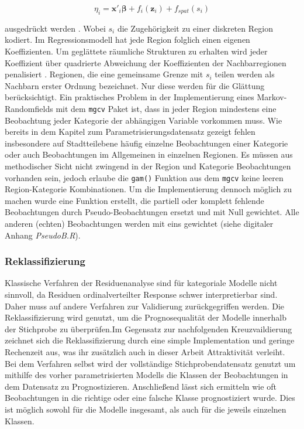 \documentclass{Vorlage}
\begin{document}
\begin{equation}
\eta_{i} =\mathbf{x}'_i \boldsymbol{\beta}+f_{i}(\mathbf{z}_{i})+f_{spat}(s_i)
\end{equation}

ausgedrückt werden \cite[p. 541]{fahrmeir2013regression}. Wobei $s_i$ die Zugehörigkeit zu einer diskreten Region kodiert. Im Regressionsmodell hat jede Region folglich einen eigenen Koeffizienten. Um geglättete räumliche Strukturen zu erhalten wird jeder Koeffizient über quadrierte Abweichung der Koeffizienten der Nachbarregionen penalisiert \cite[p. 522]{fahrmeir2013regression}. Regionen, die eine gemeinsame Grenze mit $s_i$ teilen werden als Nachbarn erster Ordnung bezeichnet. Nur diese werden für die Glättung berücksichtigt.
Ein praktisches Problem in der Implementierung eines Markov-Randomfields mit dem \texttt{mgcv} Paket ist, dass in jeder Region mindestens eine Beobachtung jeder Kategorie der abhängigen Variable vorkommen muss. Wie bereits in dem Kapitel zum Parametrisierungsdatensatz gezeigt fehlen insbesondere auf Stadtteilebene häufig einzelne Beobachtungen einer Kategorie oder auch Beobachtungen im Allgemeinen in einzelnen Regionen. Es müssen aus methodischer Sicht nicht zwingend in der Region und Kategorie Beobachtungen vorhanden sein, jedoch erlaube die \texttt{gam()} Funktion aus dem \texttt{mgcv} keine leeren Region-Kategorie Kombinationen. Um die Implementierung dennoch möglich zu machen wurde eine Funktion erstellt, die partiell oder komplett fehlende Beobachtungen durch Pseudo-Beobachtungen ersetzt und mit Null gewichtet. Alle anderen (echten) Beobachtungen werden mit eins gewichtet (siehe digitaler Anhang \textit{PseudoB.R}).

\subsubsection{Reklassifizierung}
Klassische Verfahren der Residuenanalyse sind für kategoriale Modelle nicht sinnvoll, da Residuen ordinalverteilter Response schwer interpretierbar sind. Daher muss auf andere Verfahren zur Validierung zurückgegriffen werden. Die Reklassifizierung wird genutzt, um die Prognosequalität der Modelle innerhalb der Stichprobe zu überprüfen.Im Gegensatz zur nachfolgenden Kreuzvaildierung zeichnet sich die Reklassifizierung durch eine simple Implementation und geringe Rechenzeit aus, was ihr zusätzlich auch in dieser Arbeit Attraktivität verleiht. Bei dem Verfahren selbst wird der vollständige Stichprobendatensatz genutzt um mithilfe des vorher parametrisierten Modells die Klassen der Beobachtungen in dem Datensatz zu Prognostizieren. Anschließend lässt sich ermitteln wie oft Beobachtungen in die richtige oder eine falsche Klasse prognostiziert wurde. Dies ist möglich sowohl für die Modelle insgesamt, als auch für die jeweils einzelnen Klassen.
\end{document}
